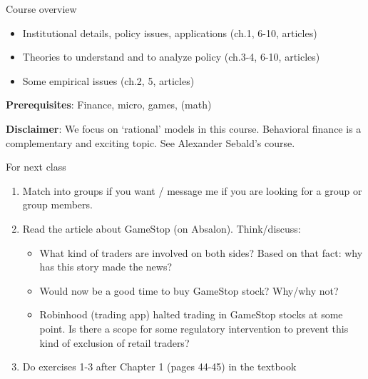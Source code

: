 \documentclass[english,10pt
,aspectratio=169
]{beamer}
\begin{document}
\begin{frame}{Course overview}
	\begin{itemize}
		\item Institutional details, policy issues, applications (ch.1, 6-10, articles)
		\item Theories to understand and to analyze policy (ch.3-4, 6-10, articles)
		\item Some empirical issues (ch.2, 5, articles)
	\end{itemize}
	
	\textbf{Prerequisites}: Finance, micro, games, (math)
	
	\textbf{Disclaimer}: We focus on `rational' models in this course.
	Behavioral finance is a complementary and exciting topic. See
	Alexander Sebald's course.
\end{frame}


\begin{frame}{For next class}
\begin{enumerate}
	\item Match into groups if you want / message me if you are looking for a group or group members.
	\item Read the article about GameStop (on Absalon). Think/discuss:
	\begin{itemize}
		\item What kind of traders are involved on both sides? Based on that fact: why has this story made the news?
		\item Would now be a good time to buy GameStop stock? Why/why not?
		\item Robinhood (trading app) halted trading in GameStop stocks at some point. Is there a scope for some regulatory intervention to prevent this kind of exclusion of retail traders?
	\end{itemize} 
	\item Do exercises 1-3 after Chapter 1 (pages 44-45) in the textbook
\end{enumerate}
\end{frame}
\end{document}

